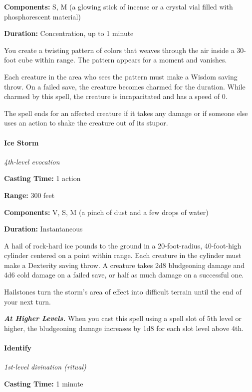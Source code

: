 \documentclass[
]{article}
\begin{document}
\textbf{Components:} S, M (a glowing stick of incense or a crystal vial
filled with phosphorescent material)

\textbf{Duration:} Concentration, up to 1 minute

You create a twisting pattern of colors that weaves through the air
inside a 30-foot cube within range. The pattern appears for a moment and
vanishes.

Each creature in the area who sees the pattern must make a Wisdom saving
throw. On a failed save, the creature becomes charmed for the duration.
While charmed by this spell, the creature is incapacitated and has a
speed of 0.

The spell ends for an affected creature if it takes any damage or if
someone else uses an action to shake the creature out of its stupor.

\hypertarget{ice-storm}{%
\paragraph{Ice Storm}\label{ice-storm}}

\emph{4th-level evocation}

\textbf{Casting Time:} 1 action

\textbf{Range:} 300 feet

\textbf{Components:} V, S, M (a pinch of dust and a few drops of water)

\textbf{Duration:} Instantaneous

A hail of rock-hard ice pounds to the ground in a 20-foot-radius,
40-foot-high cylinder centered on a point within range. Each creature in
the cylinder must make a Dexterity saving throw. A creature takes 2d8
bludgeoning damage and 4d6 cold damage on a failed save, or half as much
damage on a successful one.

Hailstones turn the storm's area of effect into difficult terrain until
the end of your next turn.

\emph{\textbf{At Higher Levels.}} When you cast this spell using a spell
slot of 5th level or higher, the bludgeoning damage increases by 1d8 for
each slot level above 4th.

\hypertarget{identify}{%
\paragraph{Identify}\label{identify}}

\emph{1st-level divination (ritual)}

\textbf{Casting Time:} 1 minute
\end{document}
